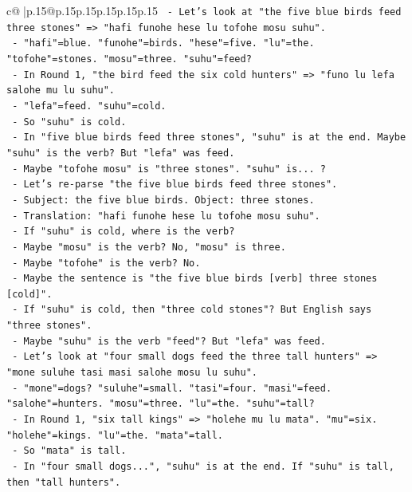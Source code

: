 \documentclass{article}
\begin{document}
{\begin{supertabular}{c@{$\;$}|p{.15\linewidth}@{}p{.15\linewidth}p{.15\linewidth}p{.15\linewidth}p{.15\linewidth}p{.15\linewidth}}
{{{\texttt{      {-} Let's look at "the five blue birds feed three stones" => "hafi funohe hese lu tofohe mosu suhu".} \\
\texttt{        {-} "hafi"=blue. "funohe"=birds. "hese"=five. "lu"=the. "tofohe"=stones. "mosu"=three. "suhu"=feed?} \\
\texttt{        {-} In Round 1, "the bird feed the six cold hunters" => "funo lu lefa salohe mu lu suhu".} \\
\texttt{        {-} "lefa"=feed. "suhu"=cold.} \\
\texttt{        {-} So "suhu" is cold.} \\
\texttt{        {-} In "five blue birds feed three stones", "suhu" is at the end. Maybe "suhu" is the verb? But "lefa" was feed.} \\
\texttt{        {-} Maybe "tofohe mosu" is "three stones". "suhu" is... ?} \\
\texttt{        {-} Let's re{-}parse "the five blue birds feed three stones".} \\
\texttt{        {-} Subject: the five blue birds. Object: three stones.} \\
\texttt{        {-} Translation: "hafi funohe hese lu tofohe mosu suhu".} \\
\texttt{        {-} If "suhu" is cold, where is the verb?} \\
\texttt{        {-} Maybe "mosu" is the verb? No, "mosu" is three.} \\
\texttt{        {-} Maybe "tofohe" is the verb? No.} \\
\texttt{        {-} Maybe the sentence is "the five blue birds {[}verb{]} three stones {[}cold{]}".} \\
\texttt{        {-} If "suhu" is cold, then "three cold stones"? But English says "three stones".} \\
\texttt{        {-} Maybe "suhu" is the verb "feed"? But "lefa" was feed.} \\
\texttt{        {-} Let's look at "four small dogs feed the three tall hunters" => "mone suluhe tasi masi salohe mosu lu suhu".} \\
\texttt{        {-} "mone"=dogs? "suluhe"=small. "tasi"=four. "masi"=feed. "salohe"=hunters. "mosu"=three. "lu"=the. "suhu"=tall?} \\
\texttt{        {-} In Round 1, "six tall kings" => "holehe mu lu mata". "mu"=six. "holehe"=kings. "lu"=the. "mata"=tall.} \\
\texttt{        {-} So "mata" is tall.} \\
\texttt{        {-} In "four small dogs...", "suhu" is at the end. If "suhu" is tall, then "tall hunters".} \\
}}}
\end{supertabular}}
\end{document}
